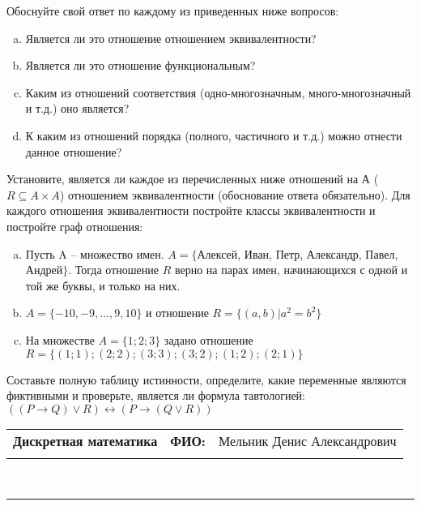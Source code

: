 \documentclass[10pt]{exam}
\newcommand{\class}{Дискретная математика}
\newcommand{\examdate}{}
\begin{document}
\begin{questions}
Обоснуйте свой ответ по каждому из приведенных ниже вопросов:
\begin{enumerate} [a)]\setcounter{enumi}{0}
    \item Является ли это отношение отношением эквивалентности?
    \item Является ли это отношение функциональным?
    \item Каким из отношений соответствия (одно-многозначным, много-многозначный и т.д.) оно является?
    \item К каким из отношений порядка (полного, частичного и т.д.) можно отнести данное отношение?
\end{enumerate}
\question
Установите, является ли каждое из перечисленных ниже отношений на А ($R \subseteq A \times A$) отношением эквивалентности (обоснование ответа обязательно). Для каждого отношения эквивалентности постройте классы 
эквивалентности и постройте граф отношения:
\begin{enumerate} [a)]\setcounter{enumi}{0}
\item Пусть A – множество имен. $A = \{ $Алексей, Иван, Петр, Александр, Павел, Андрей$ \}$. Тогда отношение $R$ верно на парах имен, начинающихся с одной и той же буквы, и только на них.
\item $A = \{-10, -9, … , 9, 10\}$ и отношение $ R = \{(a,b)|a^{2} = b^{2}\}$
\item На множестве $A = \{1; 2; 3\}$ задано отношение $R = \{(1; 1); (2; 2); (3; 3); (3; 2); (1; 2); (2; 1)\}$
\end{enumerate}\question Составьте полную таблицу истинности, определите, какие переменные являются фиктивными и проверьте, является ли формула тавтологией:
$((P \rightarrow Q) \lor R) \leftrightarrow (P \rightarrow (Q \lor R))$

\end{questions}
\newpage
\begin{flushright}
\begin{tabular}{p{2.8in} r l}
\textbf{\class} & \textbf{ФИО:} &Мельник Денис Александрович
\\

\textbf{\examdate} &&\\
\end{tabular}\\
\end{flushright}
\rule[1ex]{\textwidth}{.1pt}
\end{document}
